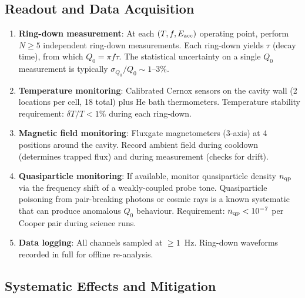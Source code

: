 \documentclass[11pt]{article}
\begin{document}
\subsection{Readout and Data Acquisition}

\begin{enumerate}[nosep]
\item \textbf{Ring-down measurement}: At each $(T, f, E_{\rm acc})$
  operating point, perform $N \geq 5$ independent ring-down
  measurements. Each ring-down yields $\tau$ (decay time), from which
  $Q_0 = \pi f \tau$. The statistical uncertainty on a single $Q_0$
  measurement is typically $\sigma_{Q_0}/Q_0 \sim 1$--$3\%$.

\item \textbf{Temperature monitoring}: Calibrated Cernox sensors on
  the cavity wall (2 locations per cell, 18 total) plus He bath
  thermometers. Temperature stability requirement: $\delta T/T < 1\%$
  during each ring-down.

\item \textbf{Magnetic field monitoring}: Fluxgate magnetometers (3-axis)
  at 4 positions around the cavity. Record ambient field during cooldown
  (determines trapped flux) and during measurement (checks for drift).

\item \textbf{Quasiparticle monitoring}: If available, monitor
  quasiparticle density $n_{\rm qp}$ via the frequency shift of a
  weakly-coupled probe tone. Quasiparticle poisoning from pair-breaking
  photons or cosmic rays is a known systematic that can produce
  anomalous $Q_0$ behaviour. Requirement: $n_{\rm qp} < 10^{-7}$ per
  Cooper pair during science runs.

\item \textbf{Data logging}: All channels sampled at $\geq 1$~Hz.
  Ring-down waveforms recorded in full for offline re-analysis.
\end{enumerate}

\subsection{Systematic Effects and Mitigation}
\end{document}
